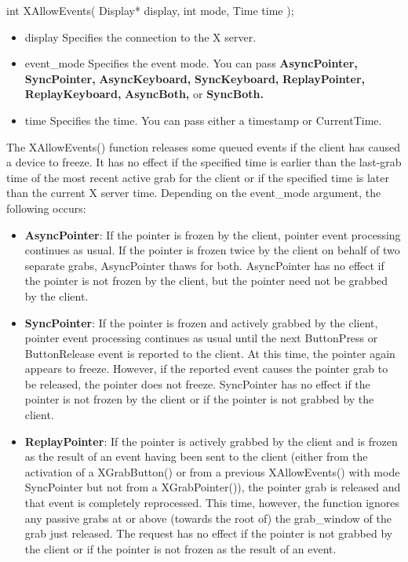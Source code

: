 \documentclass{report}
\begin{document}
\begin{itemize}
\begin{cppcode}
                int XAllowEvents(
                    Display* display, 
                    int mode, 
                    Time time
                );
            \end{cppcode}
            \begin{itemize}
                \item display	Specifies the connection to the X server.
                \item event\_mode	Specifies the event mode. You can pass \textbf{AsyncPointer,} \textbf{SyncPointer,} \textbf{AsyncKeyboard,} \textbf{SyncKeyboard,} \textbf{ReplayPointer,} \textbf{ReplayKeyboard,} \textbf{AsyncBoth,} or \textbf{SyncBoth.}
                \item time	Specifies the time. You can pass either a timestamp or CurrentTime.
            \end{itemize}
            The XAllowEvents() function releases some queued events if the client has caused a device to freeze. It has no effect if the specified time is earlier than the last-grab time of the most recent active grab for the client or if the specified time is later than the current X server time. Depending on the event\_mode argument, the following occurs:
            \begin{itemize}
                \item \textbf{AsyncPointer}:	If the pointer is frozen by the client, pointer event processing continues as usual. If the pointer is frozen twice by the client on behalf of two separate grabs, AsyncPointer thaws for both. AsyncPointer has no effect if the pointer is not frozen by the client, but the pointer need not be grabbed by the client.
                \item \textbf{SyncPointer}:	If the pointer is frozen and actively grabbed by the client, pointer event processing continues as usual until the next ButtonPress or ButtonRelease event is reported to the client. At this time, the pointer again appears to freeze. However, if the reported event causes the pointer grab to be released, the pointer does not freeze. SyncPointer has no effect if the pointer is not frozen by the client or if the pointer is not grabbed by the client.
                \item \textbf{ReplayPointer}:	If the pointer is actively grabbed by the client and is frozen as the result of an event having been sent to the client (either from the activation of a XGrabButton() or from a previous XAllowEvents() with mode SyncPointer but not from a XGrabPointer()), the pointer grab is released and that event is completely reprocessed. This time, however, the function ignores any passive grabs at or above (towards the root of) the grab\_window of the grab just released. The request has no effect if the pointer is not grabbed by the client or if the pointer is not frozen as the result of an event.

\end{itemize}
\end{itemize}
\end{document}
